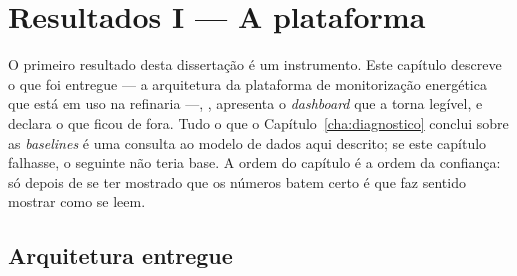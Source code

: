 
\chapter{Resultados I --- A plataforma}
\label{cha:plataforma}

O primeiro resultado desta dissertação é um instrumento. Este capítulo
descreve o que foi entregue --- a arquitetura da plataforma de
monitorização energética que está em uso na refinaria ---, , apresenta o \emph{dashboard} que a
torna legível, e declara o que ficou de fora. Tudo o que o
Capítulo~\ref{cha:diagnostico} conclui sobre as \emph{baselines} é uma
consulta ao modelo de dados aqui descrito; se este capítulo falhasse, o
seguinte não teria base. A ordem do capítulo é a ordem da confiança: só
depois de se ter mostrado que os números batem certo é que faz sentido
mostrar como se leem.

\section{Arquitetura entregue}
\label{sec:arquitetura}

